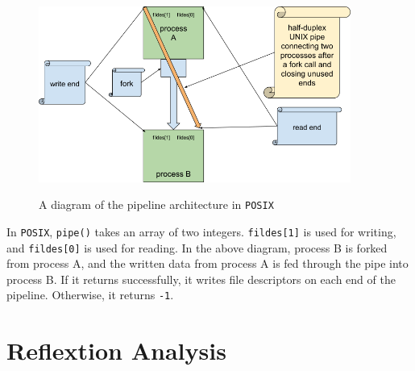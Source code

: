 \documentclass[12pt, dvipsnames, a4paper]{article}
\newcommand{\code}[1]{\texttt{#1}}
\begin{document}
\begin{figure}[!htb]
	\centering
	\includegraphics[width=290pt]{assets/localipc2.png}
	\caption{A diagram of the pipeline architecture in \code{POSIX}} \cite{rytarowski}
\end{figure}

In \code{POSIX}, \code{pipe()} takes an array of two integers. \code{fildes[1]} is used for writing, and \code{fildes[0]} is used for reading. In the above diagram, process B is forked from process A, and the written data from process A is fed through the pipe into process B. If it returns successfully, it writes file descriptors on each end of the pipeline. Otherwise, it returns \code{-1}.

\clearpage
\section{Reflextion Analysis}
\end{document}
